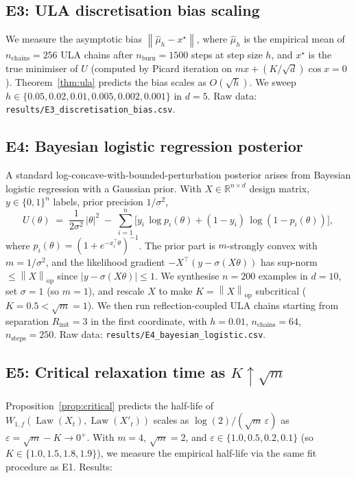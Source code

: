 \documentclass[11pt]{article}
\theoremstyle{definition}
\DeclareMathOperator{\Law}{Law}
\newcommand{\R}{\mathbb{R}}
\newcommand{\norm}[1]{\left\lVert #1 \right\rVert}
\newcommand{\abs}[1]{\left\lvert #1 \right\rvert}
\begin{document}
\subsection{E3: ULA discretisation bias scaling}
We measure the asymptotic bias $\norm{\hat\mu_h - x^\star}$, where $\hat\mu_h$ is the empirical mean of $n_{\mathrm{chains}} = 256$ ULA chains after $n_{\mathrm{burn}} = 1500$ steps at step size $h$, and $x^\star$ is the true minimiser of $U$ (computed by Picard iteration on $m x + (K/\sqrt d)\cos x = 0$). Theorem~\ref{thm:ula} predicts the bias scales as $O(\sqrt h)$. We sweep $h \in \{0.05, 0.02, 0.01, 0.005, 0.002, 0.001\}$ in $d = 5$. Raw data: \texttt{results/E3\_discretisation\_bias.csv}.

\subsection{E4: Bayesian logistic regression posterior}
A standard log-concave-with-bounded-perturbation posterior arises from Bayesian logistic regression with a Gaussian prior. With $X \in \R^{n \times d}$ design matrix, $y \in \{0,1\}^n$ labels, prior precision $1/\sigma^2$,
\[
U(\theta) \;=\; \frac{1}{2\sigma^2}\,\abs{\theta}^2 \;-\; \sum_{i=1}^n \bigl[y_i\,\log p_i(\theta) + (1 - y_i)\,\log(1 - p_i(\theta))\bigr],
\]
where $p_i(\theta) = (1 + e^{-x_i^\top\theta})^{-1}$. The prior part is $m$-strongly convex with $m = 1/\sigma^2$, and the likelihood gradient $-X^\top(y - \sigma(X\theta))$ has sup-norm $\le \norm{X}_{\mathrm{op}}$ since $\abs{y - \sigma(X\theta)} \le 1$. We synthesise $n = 200$ examples in $d = 10$, set $\sigma = 1$ (so $m = 1$), and rescale $X$ to make $K = \norm{X}_{\mathrm{op}}$ subcritical ($K = 0.5 < \sqrt m = 1$). We then run reflection-coupled ULA chains starting from separation $R_{\mathrm{init}} = 3$ in the first coordinate, with $h = 0.01$, $n_{\mathrm{chains}} = 64$, $n_{\mathrm{steps}} = 250$. Raw data: \texttt{results/E4\_bayesian\_logistic.csv}.

\subsection{E5: Critical relaxation time as $K \uparrow \sqrt m$}
Proposition~\ref{prop:critical} predicts the half-life of $W_{1,f}(\Law(X_t), \Law(X'_t))$ scales as $\log(2)/(\sqrt m\,\varepsilon)$ as $\varepsilon = \sqrt m - K \to 0^+$. With $m = 4$, $\sqrt m = 2$, and $\varepsilon \in \{1.0, 0.5, 0.2, 0.1\}$ (so $K \in \{1.0, 1.5, 1.8, 1.9\}$), we measure the empirical half-life via the same fit procedure as E1. Results:
\end{document}

